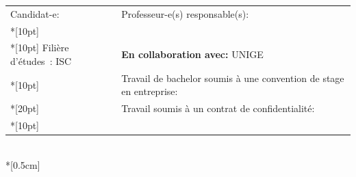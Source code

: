 \begin{spacing}{0.96}
	\vfill

	\begin{center}
		{\sf
			\begin{tabular*}{16cm}{p{7.58cm} p{7.58cm}}
				\small Candidat-e:					&	\small Professeur-e(s) responsable(s):\\*[10pt]
				\small\textbf{\textsc{\Author}}		&	\small\textbf{\textsc{\Professor}}\\*[10pt]
				\footnotesize  Filière d’études : ISC	&	\footnotesize  \textbf{En collaboration avec:} UNIGE\\*[10pt]
				\footnotesize  {} & \footnotesize  Travail de bachelor soumis à une convention de stage en entreprise: \Convention\\*[20pt]
				\footnotesize  {} & \footnotesize  Travail soumis à un contrat de confidentialité: \Confidentiel\\*[10pt]
			\end{tabular*}\\*[0.5cm]
		}
	\end{center}
\end{spacing}

